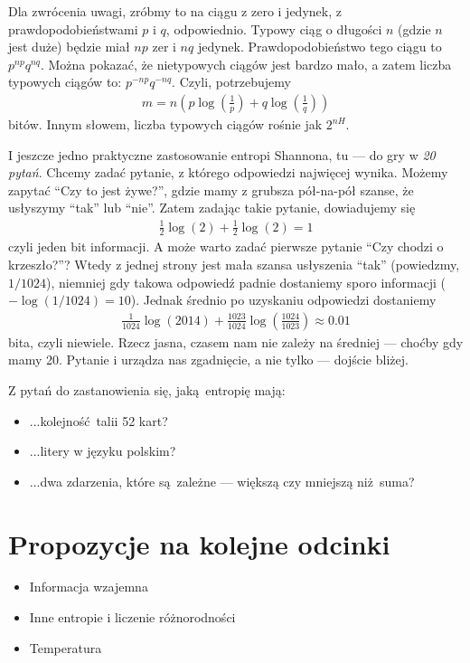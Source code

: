 \documentclass[10pt,a4paper]{article}
\begin{document}
Dla zwrócenia uwagi, zróbmy to na ciągu z zero i jedynek, z prawdopodobieństwami $p$ i $q$, odpowiednio.
Typowy ciąg o długości $n$ (gdzie $n$ jest duże) będzie miał $n p$ zer i $n q$ jedynek.
Prawdopodobieństwo tego ciągu to $p^{n p}q^{n q}$.
Można pokazać, że nietypowych ciągów jest bardzo mało, a zatem liczba typowych ciągów to:
$p^{-n p}q^{-n q}$.
Czyli, potrzebujemy
%
\begin{align}
    m=n \left( p \log(\tfrac{1}{p}) + q \log(\tfrac{1}{q}) \right)
\end{align}
%
bitów.
Innym słowem, liczba typowych ciągów rośnie jak $2^{n H}$.


I jeszcze jedno praktyczne zastosowanie entropi Shannona, tu --- do gry w \emph{20 pytań}.
Chcemy zadać pytanie, z którego odpowiedzi najwięcej wynika.
Możemy zapytać ``Czy to jest żywe?'', gdzie mamy z grubsza pół-na-pół szanse, że usłyszymy ``tak'' lub ``nie''.
Zatem zadając takie pytanie, dowiadujemy się
%
\begin{align}
    \tfrac{1}{2} \log(2) + \tfrac{1}{2} \log(2)  = 1
\end{align}
%
czyli jeden bit informacji. 
A może warto zadać pierwsze pytanie ``Czy chodzi o krzeszło?''?
Wtedy z jednej strony jest mała szansa usłyszenia ``tak'' (powiedzmy, $1/1024$),
niemniej gdy takowa odpowiedź padnie dostaniemy sporo informacji  ($-\log(1/1024)=10$).
Jednak średnio po uzyskaniu odpowiedzi dostaniemy
%
\begin{align}
    \tfrac{1}{1024} \log(2014) + \tfrac{1023}{1024} \log(\tfrac{1024}{1023}) \approx 0.01
\end{align}
%
bita, czyli niewiele.
Rzecz jasna, czasem nam nie zależy na średniej --- choćby gdy mamy 20.
Pytanie i urządza nas zgadnięcie, a nie tylko --- dojście bliżej.

Z pytań do zastanowienia się, jaką entropię mają:
\begin{itemize}
    \item ...kolejność talii 52 kart?
    \item ...litery w języku polskim?
    \item ...dwa zdarzenia, które są zależne --- większą czy mniejszą niż suma?
\end{itemize}


\section{Propozycje na kolejne odcinki}

\begin{itemize}
    \item Informacja wzajemna
    \item Inne entropie i liczenie różnorodności
    \item Temperatura
\end{itemize}
\end{document}
